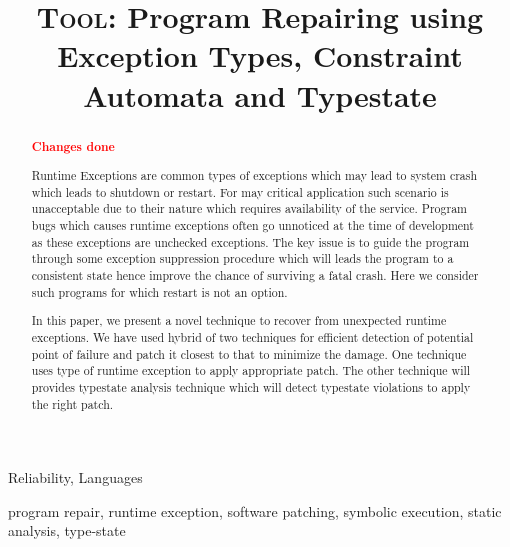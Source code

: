 \documentclass[pldi]{sigplanconf}
\def\tool{\textsc{Tool}\xspace}
\def\papertitle{\tool: Program Repairing using Exception Types, Constraint
Automata and Typestate}
\begin{document}

\title{\Large \bf \papertitle}

\maketitle

\begin{abstract}
\small
\textcolor{red}{\textbf{Changes done}}\newline

Runtime Exceptions are common types of exceptions which may lead to system crash
which leads to shutdown or restart. For may critical application such scenario
is unacceptable due to their nature which requires availability of the service. 
Program bugs which causes runtime exceptions often go unnoticed at the time of
development as these exceptions are unchecked exceptions. The key issue is to
guide the program through some exception suppression procedure which will leads
the program to a consistent state hence improve the chance of surviving a fatal
crash. Here we consider such programs for which restart is not an option.

In this paper, we present a novel technique to recover from unexpected runtime
exceptions. We have used hybrid of two techniques for efficient detection of
potential point of failure and patch it closest to that to minimize the damage. 
One technique uses type of runtime exception to apply appropriate patch. The
other technique will provides typestate analysis technique which will detect
typestate violations to apply the right patch.

\end{abstract}



\terms
Reliability, Languages 

\keywords
program repair, runtime exception, software patching, symbolic execution, static
analysis, type-state














\raggedright
\small


\end{document}

